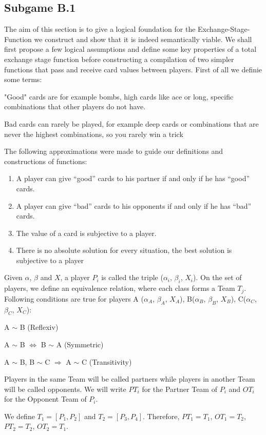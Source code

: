 \subsection{Subgame B.1}
The aim of this section is to give a logical foundation for the Exchange-Stage-Function we construct and show that it is indeed semantically viable. We shall first propose a few logical assumptions and define some key properties of a total exchange stage function before constructing a compilation of two simpler functions that pass and receive card values between players. First of all we definie some terms:
\begin{definition}
"Good" cards are for example bombs, high cards like ace or long, specific combinations that other players do not have.
\end{definition}
\begin{definition}
Bad cards can rarely be played, for example deep cards or combinations that are never the highest combinations, so you rarely win a trick
\end{definition}
The following approximations were made to guide our definitions and constructions of functions:
\begin{enumerate}
\item A player can give “good” cards to his partner if and only if he has “good” cards.
\item A player can give “bad” cards to his opponents if and only if he has “bad” cards. 
\item The value of a card is subjective to a player. 
\item There is no absolute solution for every situation, the best solution is subjective to a player \\
\end{enumerate}
\begin{definition}
Given $\alpha$, $\beta$ and $X$, a player $P_i$ is called the triple ($\alpha_i$, $\beta_i$, $X_i$). 
On the set of players, we define an equivalence relation, where each class forms a Team $T_j$. Following conditions are true for players A ($\alpha_A$, $\beta_A$, $X_A$), B($\alpha_B$, $\beta_B$, $X_B$), C($\alpha_C$, $\beta_C$, $X_C$):
 \begin{axioms}[(P1)]
  \item A $\sim $ B (Reflexiv)
  \item A $\sim$ B $\Leftrightarrow$ B $\sim$ A (Symmetric)
  \item A $\sim$ B, B $\sim$ C $\Rightarrow$ A $\sim$ C (Transitivity)
  \end{axioms}
Players in the same Team will be called partners while players in another Team will be called opponents. We will write $PT_i$ for the Partner Team of $P_i$ and $OT_i$  for the Opponent Team of $P_i$.

We define $T_1 = [P_1,P_2]$  and $T_2 = [P_3,P_4]$. Therefore, $PT_1 = T_1$, $OT_1 = T_2$, $PT_2 = T_2$, $OT_2 = T_1$.

\end{definition}

